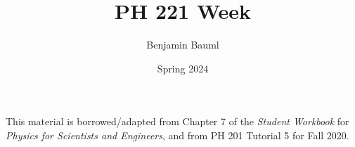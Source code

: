 \documentclass[]{article}
\title{PH 221 Week \Week}
\author{Benjamin Bauml}
\date{Spring 2024}
\newcommand{\FileDepth}{../../..}
\begin{document}
\maketitle
\begin{center}
	This material is borrowed/adapted from Chapter 7 of the \textit{Student Workbook} for \textit{Physics for Scientists and Engineers}, and from PH 201 Tutorial 5 for Fall 2020.
\end{center}



\end{document}
